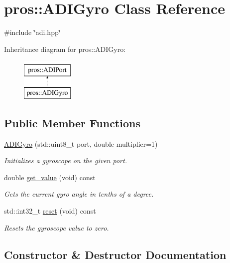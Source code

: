 \hypertarget{classpros_1_1ADIGyro}{}\section{pros\+:\+:A\+D\+I\+Gyro Class Reference}
\label{classpros_1_1ADIGyro}


{\ttfamily \#include \char`\"{}adi.\+hpp\char`\"{}}

Inheritance diagram for pros\+:\+:A\+D\+I\+Gyro\+:\begin{figure}[H]
\begin{center}
\leavevmode
\includegraphics[height=2.000000cm]{classpros_1_1ADIGyro}
\end{center}
\end{figure}
\subsection*{Public Member Functions}
\begin{DoxyCompactItemize}
\item 
\hyperlink{classpros_1_1ADIGyro_adc826b3bcb88213a0df283178279662a}{A\+D\+I\+Gyro} (std\+::uint8\+\_\+t port, double multiplier=1)
\begin{DoxyCompactList}\small\item\em Initializes a gyroscope on the given port. \end{DoxyCompactList}\item 
double \hyperlink{classpros_1_1ADIGyro_a829f933aaaa370483c36aba9f4a4f09c}{get\+\_\+value} (void) const
\begin{DoxyCompactList}\small\item\em Gets the current gyro angle in tenths of a degree. \end{DoxyCompactList}\item 
std\+::int32\+\_\+t \hyperlink{classpros_1_1ADIGyro_a3e2df8c21f4eb0bfa3559834221195fe}{reset} (void) const
\begin{DoxyCompactList}\small\item\em Resets the gyroscope value to zero. \end{DoxyCompactList}\end{DoxyCompactItemize}


\subsection{Constructor \& Destructor Documentation}
\mbox{\label{classpros_1_1ADIGyro_adc826b3bcb88213a0df283178279662a}} 
